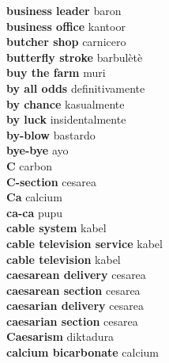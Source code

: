 \textbf{ business leader  } baron \\
\textbf{ business office  } kantoor \\
\textbf{ butcher shop  } carnicero \\
\textbf{ butterfly stroke  } barbulètè \\
\textbf{ buy the farm  } muri \\
\textbf{ by all odds  } definitivamente \\
\textbf{ by chance  } kasualmente \\
\textbf{ by luck  } insidentalmente \\
\textbf{ by-blow  } bastardo \\
\textbf{ bye-bye  } ayo \\
\textbf{ C  } carbon \\
\textbf{ C-section  } cesarea \\
\textbf{ Ca  } calcium \\
\textbf{ ca-ca  } pupu \\
\textbf{ cable system  } kabel \\
\textbf{ cable television service  } kabel \\
\textbf{ cable television  } kabel \\
\textbf{ caesarean delivery  } cesarea \\
\textbf{ caesarean section  } cesarea \\
\textbf{ caesarian delivery  } cesarea \\
\textbf{ caesarian section  } cesarea \\
\textbf{ Caesarism  } diktadura \\
\textbf{ calcium bicarbonate  } calcium \\
